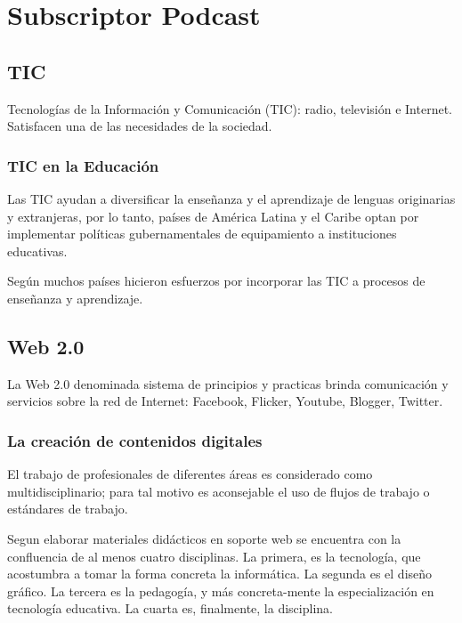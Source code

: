\chapter{Subscriptor Podcast}

\section{TIC}

Tecnologías de la Información y Comunicación (TIC): radio, televisión e
Internet. Satisfacen una de las necesidades de la sociedad.

\subsection{TIC en la Educación}

Las TIC ayudan a diversificar la enseñanza y el aprendizaje de lenguas 
originarias y extranjeras, por lo tanto, países de América Latina y el
Caribe optan por implementar políticas gubernamentales de equipamiento a
instituciones educativas.

Según \cite{severin2013enfoques} muchos países hicieron esfuerzos por
incorporar las TIC a procesos de enseñanza y aprendizaje. 

\section{Web 2.0}

La Web 2.0 denominada sistema de principios y practicas brinda comunicación y
servicios sobre la red de Internet: Facebook, Flicker, Youtube, Blogger, Twitter.

\subsection{La creación de contenidos digitales}

El trabajo de profesionales de diferentes áreas es considerado como
multidisciplinario; para tal motivo es aconsejable el uso de flujos de trabajo
o estándares de trabajo. 

Segun \cite{duart2000aprender} elaborar materiales didácticos en soporte web
se encuentra con la confluencia de al menos cuatro disciplinas. La primera, es
la tecnología, que acostumbra a tomar la forma concreta la informática. La
segunda es el diseño gráfico. La tercera es la pedagogía, y más concreta-mente
la especialización en tecnología educativa. La cuarta es, finalmente, la
disciplina.

